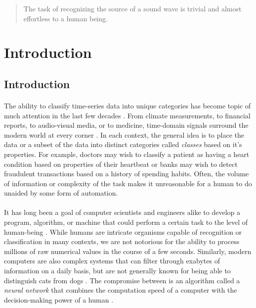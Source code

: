 \documentclass[12pt,letterpaper]{article}
\begin{document}
\begin{abstract}

The task of recognizing the source of a sound wave is trivial and almost effortless to a human being. 

\end{abstract}

\newpage
\section{Introduction}
\label{sec-Introduction}


\subsection{Introduction}

\paragraph*{}The ability to classify time-series data into unique categories has become topic of much attention in the last few decades \cite{Khan,Mierswa}. From climate measurements, to financial reports, to audio-visual media, or to medicine, time-domain signals surround the modern world at every corner \cite{Liu,Zhang}. In each context, the general idea is to place the data or a subset of the data into distinct categories called \textit{classes} based on it's properties. For example, doctors may wish to classify a patient as having a heart condition based on properties of their heartbeat or banks may wish to detect fraudulent transactions based on a history of spending habits. Often, the volume  of information or complexity of the task makes it unreasonable for a human to do unaided by some form of automation.

\paragraph*{}It has long been a goal of computer scientists and engineers alike to develop a program, algorithm, or machine that could perform a certain task to the level of human-being \cite{Bishop,Geron,Loy}. While humans are intricate organisms capable of recognition or classification in many contexts, we are not notorious for the ability to process millions of raw numerical values in the course of a few seconds. Similarly, modern computers are also complex systems that can filter through exabytes of information on a daily basis, but are not generally known for being able to distinguish cats from dogs \cite{Geron}. The compromise between is an algorithm called a \textit{neural network} that combines the computation speed of a computer with the decision-making power of a human \cite{Goodfellow,Levine,Loy}.
\end{document}
